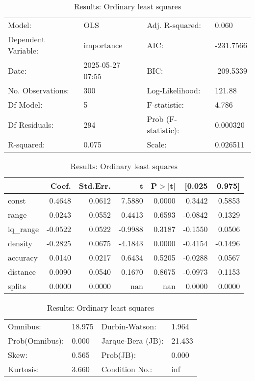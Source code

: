 \begin{table}
\caption{Results: Ordinary least squares}
\label{}
\begin{center}
\begin{tabular}{llll}
\hline
Model:              & OLS              & Adj. R-squared:     & 0.060      \\
Dependent Variable: & importance       & AIC:                & -231.7566  \\
Date:               & 2025-05-27 07:55 & BIC:                & -209.5339  \\
No. Observations:   & 300              & Log-Likelihood:     & 121.88     \\
Df Model:           & 5                & F-statistic:        & 4.786      \\
Df Residuals:       & 294              & Prob (F-statistic): & 0.000320   \\
R-squared:          & 0.075            & Scale:              & 0.026511   \\
\hline
\end{tabular}
\end{center}

\begin{center}
\begin{tabular}{lrrrrrr}
\hline
          &   Coef. & Std.Err. &       t & P$> |$t$|$ &  [0.025 &  0.975]  \\
\hline
const     &  0.4648 &   0.0612 &  7.5880 &      0.0000 &  0.3442 &  0.5853  \\
range     &  0.0243 &   0.0552 &  0.4413 &      0.6593 & -0.0842 &  0.1329  \\
iq\_range & -0.0522 &   0.0522 & -0.9988 &      0.3187 & -0.1550 &  0.0506  \\
density   & -0.2825 &   0.0675 & -4.1843 &      0.0000 & -0.4154 & -0.1496  \\
accuracy  &  0.0140 &   0.0217 &  0.6434 &      0.5205 & -0.0288 &  0.0567  \\
distance  &  0.0090 &   0.0540 &  0.1670 &      0.8675 & -0.0973 &  0.1153  \\
splits    &  0.0000 &   0.0000 &     nan &         nan &  0.0000 &  0.0000  \\
\hline
\end{tabular}
\end{center}

\begin{center}
\begin{tabular}{llll}
\hline
Omnibus:       & 18.975 & Durbin-Watson:    & 1.964   \\
Prob(Omnibus): & 0.000  & Jarque-Bera (JB): & 21.433  \\
Skew:          & 0.565  & Prob(JB):         & 0.000   \\
Kurtosis:      & 3.660  & Condition No.:    & inf     \\
\hline
\end{tabular}
\end{center}
\end{table}
